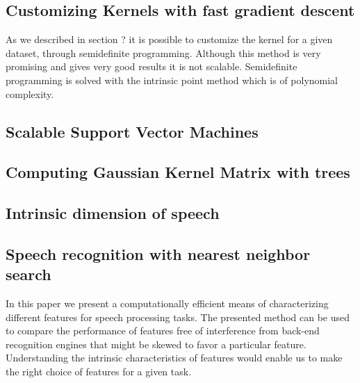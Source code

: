 \documentclass[12pt,letterpaper,doublespaced,ETD,dvips,proposal]{gtthesis}
\begin{document}
\begin{Body}
\subsection{Customizing Kernels with fast
gradient descent}

As we described in section ? it is possible to customize the kernel
for a given dataset, through semidefinite programming. Although this
method is very promising and gives very good results it is not
scalable. Semidefinite programming is solved with the intrinsic
point method which is of polynomial complexity.

\subsection{Scalable Support Vector Machines}
\subsection{Computing Gaussian Kernel Matrix with trees}
\subsection{Intrinsic dimension of speech}


\subsection{Speech recognition with nearest neighbor search}

In this paper we present a computationally efficient means of
characterizing different features for speech processing tasks. The
presented method can be used to compare the performance of features
free of interference from back-end recognition engines that might be
skewed to favor a particular feature. Understanding the intrinsic
characteristics of features would enable us to make the right choice
of features for a given task.

\end{Body}
\end{document}
